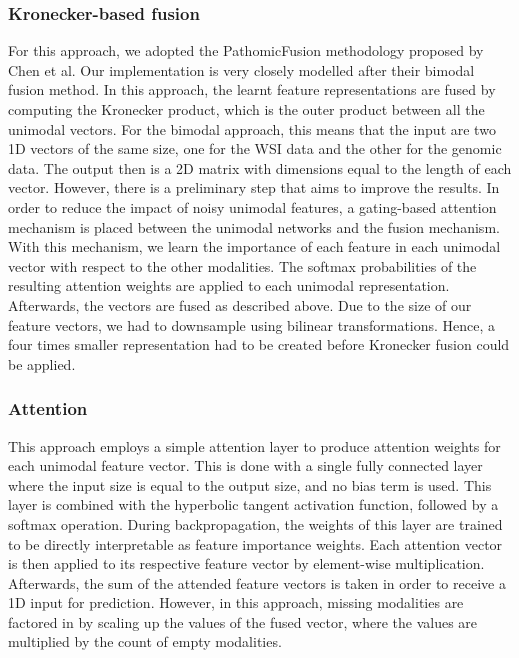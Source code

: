 \subsubsection{Kronecker-based fusion} For this approach, we adopted the PathomicFusion methodology proposed by Chen et al. Our implementation is very closely modelled after their bimodal fusion method. In this approach, the learnt feature representations are fused by computing the Kronecker product, which is the outer product between all the unimodal vectors. For the bimodal approach, this means that the input are two 1D vectors of the same size, one for the WSI data and the other for the genomic data. The output then is a 2D matrix with dimensions equal to the length of each vector. However, there is a preliminary step that aims to improve the results. In order to reduce the impact of noisy unimodal features, a gating-based attention mechanism is placed between the unimodal networks and the fusion mechanism. With this mechanism, we learn the importance of each feature in each unimodal vector with respect to the other modalities. The softmax probabilities of the resulting attention weights are applied to each unimodal representation. Afterwards, the vectors are fused as described above. \cite{Chen2022Pathomic} Due to the size of our feature vectors, we had to downsample using bilinear transformations.  Hence, a four times smaller representation had to be created before Kronecker fusion could be applied.   

\subsubsection{Attention} This approach employs a simple attention layer to produce attention weights for each unimodal feature vector. This is done with a single fully connected layer where the input size is equal to the output size, and no bias term is used. This layer is combined with the hyperbolic tangent activation function, followed by a softmax operation. During backpropagation, the weights of this layer are trained to be directly interpretable as feature importance weights. Each attention vector is then applied to its respective feature vector by element-wise multiplication. Afterwards, the sum of the attended feature vectors is taken in order to receive a 1D input for prediction. However, in this approach, missing modalities are factored in by scaling up the values of the fused vector, where the values are multiplied by the count of empty modalities.

